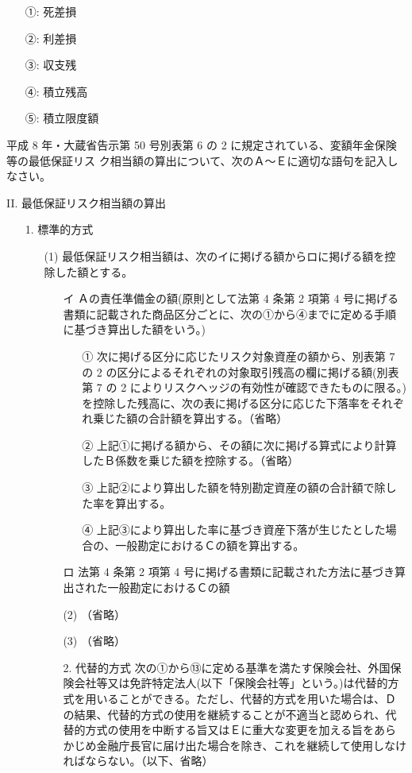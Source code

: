 \documentclass[report,gutter=10mm,fore-edge=10mm,uplatex,dvipdfmx]{jlreq}
\begin{document}
\answer{}
\begin{itemize}
\item[ ①: ] 死差損
\item[ ②: ] 利差損
\item[ ③: ] 収支残
\item[ ④: ] 積立残高
\item[ ⑤: ] 積立限度額
\end{itemize}

平成 8 年・大蔵省告示第 50 号別表第 6 の 2 に規定されている、変額年金保険等の最低保証リス
ク相当額の算出について、次のＡ～Ｅに適切な語句を記入しなさい。

II. 最低保証リスク相当額の算出
\begin{itemize}
\item[1.] 標準的方式
\begin{itemize}
\item[(1)]最低保証リスク相当額は、次のイに掲げる額からロに掲げる額を控除した額とする。
\begin{itemize}
\item[イ]Ａの責任準備金の額(原則として法第 4 条第 2 項第 4 号に掲げる書類に記載された商品区分ごとに、次の①から④までに定める手順に基づき算出した額をいう。)
\begin{itemize}
\item[①] 次に掲げる区分に応じたリスク対象資産の額から、別表第 7 の 2 の区分によるそれぞれの対象取引残高の欄に掲げる額(別表第 7 の 2 によりリスクヘッジの有効性が確認できたものに限る。)を控除した残高に、次の表に掲げる区分に応じた下落率をそれぞれ乗じた額の合計額を算出する。（省略）
\item[②] 上記①に掲げる額から、その額に次に掲げる算式により計算したＢ係数を乗じた額を控除する。（省略）
\item[③] 上記②により算出した額を特別勘定資産の額の合計額で除した率を算出する。
\item[④] 上記③により算出した率に基づき資産下落が生じたとした場合の、一般勘定におけるＣの額を算出する。
\end{itemize}
\item[ロ] 法第 4 条第 2 項第 4 号に掲げる書類に記載された方法に基づき算出された一般勘定におけるＣの額
\item[(2)] （省略）
\item[(3)] （省略）
\item[2.] 代替的方式
次の①から⑬に定める基準を満たす保険会社、外国保険会社等又は免許特定法人(以下「保険会社等」という。)は代替的方式を用いることができる。ただし、代替的方式を用いた場合は、Ｄの結果、代替的方式の使用を継続することが不適当と認められ、代替的方式の使用を中断する旨又はＥに重大な変更を加える旨をあらかじめ金融庁長官に届け出た場合を除き、これを継続して使用しなければならない。（以下、省略）
\end{itemize}
\end{itemize}
\end{itemize}
\end{document}

